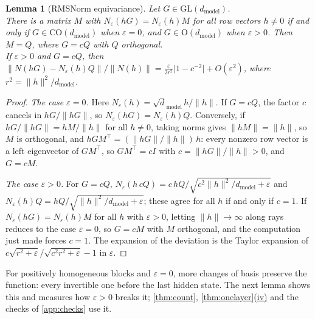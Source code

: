 \documentclass[10pt]{article}
\newtheorem{lemma}[theorem]{Lemma}
\theoremstyle{definition}
\theoremstyle{remark}
\newcommand{\dm}{d_{\mathrm{model}}}
\newcommand{\GL}{\mathrm{GL}}
\newcommand{\Ort}{\mathrm{O}}
\newcommand{\CO}{\mathrm{CO}}
\newcommand{\norm}[1]{\lVert #1\rVert}
\newcommand{\ptlabel}[1]{\phantomsection\label{#1}}
\DeclareRobustCommand{\cpref}[2]{\hyperref[#1:#2]{\cref*{#1}(#2)}}
\newcommand{\stpart}[3]{\ifx\relax#1\relax\else\ptlabel{#1:#2}\fi{\upshape\bfseries\boldmath(#2)\ifx\relax#3\relax\else\ #3.\fi}}
\begin{document}
\begin{lemma}[RMSNorm equivariance]\label{lem:rms}
Let $G \in \GL(\dm)$.\\
\stpart{}{i}{} There is a matrix $M$ with $N_\varepsilon(hG) = N_\varepsilon(h)M$ for all row vectors $h \neq 0$ if and only if $G \in \CO(\dm)$ when $\varepsilon = 0$, and $G \in \Ort(\dm)$ when $\varepsilon > 0$. Then $M = Q$, where $G = cQ$ with $Q$ orthogonal.\\
\stpart{}{ii}{} If $\varepsilon > 0$ and $G = cQ$, then $\norm{N(hG) - N_\varepsilon(h)Q}/\norm{N(h)} = \tfrac{\varepsilon}{2r^2}\lvert 1 - c^{-2}\rvert + O(\varepsilon^2)$, where $r^2 = \norm{h}^2/\dm$.
\end{lemma}
\begin{proof}
\emph{The case $\varepsilon = 0$.} Here $N_\varepsilon(h) = \sqrt \dm\,h/\norm{h}$. If $G = cQ$, the factor $c$ cancels in $hG/\norm{hG}$, so $N_\varepsilon(hG) = N_\varepsilon(h)Q$. Conversely, if $hG/\norm{hG} = hM/\norm{h}$ for all $h \neq 0$, taking norms gives $\norm{hM} = \norm{h}$, so $M$ is orthogonal, and $hGM^\top = (\norm{hG}/\norm{h})\,h$: every nonzero row vector is a left eigenvector of $GM^\top$, so $GM^\top = cI$ with $c = \norm{hG}/\norm{h} > 0$, and $G = cM$.

\emph{The case $\varepsilon > 0$.} For $G = cQ$, $N_\varepsilon(h\,cQ) = c\,hQ/\sqrt{c^2\norm{h}^2/\dm + \varepsilon}$ and $N_\varepsilon(h)Q = hQ/\sqrt{\norm{h}^2/\dm + \varepsilon}$; these agree for all $h$ if and only if $c = 1$. If $N_\varepsilon(hG) = N_\varepsilon(h)M$ for all $h$ with $\varepsilon > 0$, letting $\norm{h} \to \infty$ along rays reduces to the case $\varepsilon = 0$, so $G = cM$ with $M$ orthogonal, and the computation just made forces $c = 1$. The expansion of the deviation is the Taylor expansion of $c\sqrt{r^2+\varepsilon}/\sqrt{c^2r^2 + \varepsilon} - 1$ in $\varepsilon$.
\end{proof}

For positively homogeneous blocks and $\varepsilon = 0$, more changes of basis preserve the function: every invertible one before the last hidden state. The next lemma shows this and measures how $\varepsilon > 0$ breaks it; \cref{thm:count}, \cpref{thm:onelayer}{iv} and the checks of \cref{app:checks} use it.
\end{document}
